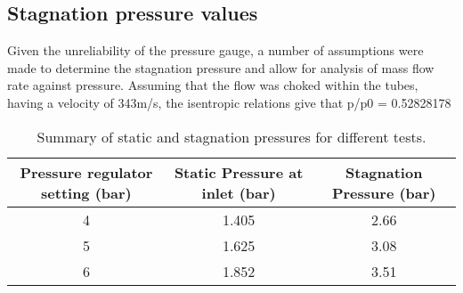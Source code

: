 \subsection{Stagnation pressure values}
Given the unreliability of the pressure gauge, a number of assumptions were made to determine the stagnation pressure and allow for analysis of mass flow rate against pressure. Assuming that the flow was choked within the tubes, having a velocity of 343m/s, the isentropic relations give that p/p0 =  0.52828178
\begin{table}[htbp]
    \centering
    \begin{tabular}{|c|c|c|}
        \hline
        Pressure regulator setting (bar) & Static Pressure at inlet (bar) &  Stagnation Pressure (bar) \\
        \hline
        4 & 1.405 & 2.66 \\
        5 & 1.625 & 3.08 \\
        6 & 1.852 & 3.51 \\
        \hline
    \end{tabular}
    \caption{Summary of static and stagnation pressures for different tests.}
    \label{tab:static-stag-pressures}
\end{table}

